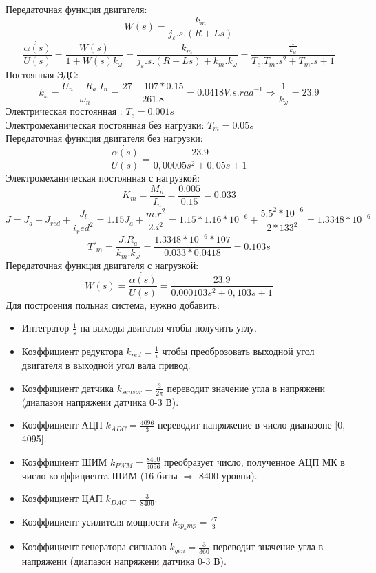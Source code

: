 \documentclass[a4paper,12pt]{article}
\begin{document}
Передаточная функция двигателя:
$$W(s)=\frac{k_m}{j_\varepsilon.s.(R+Ls)}$$
$$\frac{\dot{\alpha(s)}}{U(s)}=\frac{W(s)}{1+W(s)k_\omega}=\frac{k_m}{j_\varepsilon.s.(R+Ls)+k_m.k_\omega}=\frac{\frac{1}{k_w}}{T_e.T_m.s^2+T_m.s+1}$$
\newpage
Постоянная ЭДС:
$$k_\omega =\frac{U_n-R_a.I_n}{\omega_n}=\frac{27-107*0.15}{261.8}=0.0418 V.s.rad^{-1}\Rightarrow \frac{1}{k_\omega}=23.9$$
Электрическая постоянная : $T_e=0.001 s$\\
Электромеханическая постоянная без нагрузки: $T_m=0.05 s$\\
Передаточная функция двигателя без нагрузки:
$$ \frac{\dot{\alpha(s)}}{U(s)}= \frac{23.9}{0,00005s^2+0,05s+1}$$
Электромеханическая постоянная с нагрузкой: 
$$K_m=\frac{M_n}{I_n}=\frac{0.005}{0.15}=0.033$$
$$J=J_a+J_{red}+\frac{J_l}{i_red^2}=1.15J_a+\frac{m.r^2}{2.i^2}=1.15*1.16*10^{-6}+\frac{5.5^2*10^{-6}}{2*133^2}=1.3348*10^{-6}$$
$$T'_m=\frac{J.R_a}{k_m.k_\omega}=\frac{1.3348*10^{-6}*107}{0.033*0.0418}=0.103s$$
Передаточная функция двигателя с нагрузкой:
$$W(s)=\frac{\dot{\alpha(s)}}{U(s)}= \frac{23.9}{0.000103s^2+0,103s+1}$$
Для построения польная система, нужно добавить:
\begin{itemize}
    \item Интегратор $\frac{1}{s}$ на выходы двигатля чтобы получить углу.
    \item Коэффициент редуктора $k_{red}=\frac{1}{i}$ чтобы преоброзовать выходной угол двигателя в выходной угол вала привод.
    \item Коэффициент датчика $k_{sensor}=\frac{3}{2\pi}$ переводит значение угла в напряжени (диапазон напряжени датчика 0-3 В).
    \item Коэффициент АЦП $k_{ADC}=\frac{4096}{3}$ переводит напряжение в число диапазоне [0, 4095].
    \item Коэффициент ШИМ $k_{PWM}=\frac{8400}{4096}$  преобразует число, полученное АЦП МК в число коэффициентa ШИМ (16 биты $\Rightarrow$ 8400 уровни).
    \item Коэффициент ЦАП $k_{DAC}=\frac{3}{8400}$.
    \item Коэффициент усилителя мощности $k_{op_amp}=\frac{27}{3}$
    \item Коэффициент генератора сигналов $k_{gen}=\frac{3}{360}$ переводит значение угла в напряжени (диапазон напряжени датчика 0-3 В).
\end{itemize}
\end{document}
